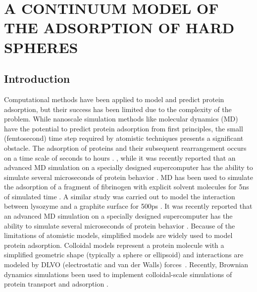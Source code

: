 
\chapter{A CONTINUUM MODEL OF THE ADSORPTION OF HARD SPHERES}


\section{Introduction}

Computational methods have been applied to model and predict protein
adsorption, but their success has been limited due to the complexity
of the problem. While nanoscale simulation methods like molecular
dynamics (MD) have the potential to predict protein adsorption from
first principles, the small (femtosecond) time step required by atomistic
techniques presents a significant obstacle. The adsorption of proteins
and their subsequent rearrangement occurs on a time scale of seconds
to hours \cite{Latour2005}. , while it was recently reported that
an advanced MD simulation on a specially designed supercomputer has
the ability to simulate several microseconds of protein behavior \cite{Dror2010}.
MD has been used to simulate the adsorption of a fragment of fibrinogen
with explicit solvent molecules for 5ns of simulated time \cite{Agashe2005}.
A similar study was carried out to model the interaction between lysozyme
and a graphite surface for 500ps \cite{Raffaini2010}. It was recently
reported that an advanced MD simulation on a specially designed supercomputer
has the ability to simulate several microseconds of protein behavior
\cite{Dror2010}. Because of the limitations of atomistic models,
simplified models are widely used to model protein adsorption. Colloidal
models represent a protein molecule with a simplified geometric shape
(typically a sphere or ellipsoid) and interactions are modeled by
DLVO (electrostatic and van der Walls) forces~\cite{evans1994colloidal,Roth1993,Lenhoff1995}.
Recently, Brownian dynamics simulations been used to implement colloidal-scale
simulations of protein transport and adsorption \cite{Unni2005,Magan2006,Quinn2008}. 

